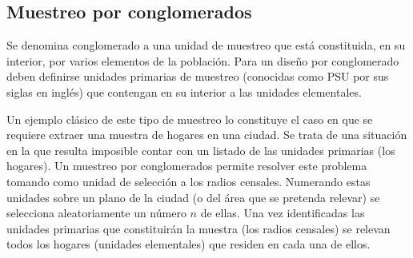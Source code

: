 \documentclass[]{book}
\begin{document}
\hypertarget{muestreo-por-conglomerados}{%
\subsection{Muestreo por conglomerados}\label{muestreo-por-conglomerados}}

Se denomina conglomerado a una unidad de muestreo que está constituida,
en su interior, por varios elementos de la población. Para un diseño por
conglomerado deben definirse unidades primarias de muestreo (conocidas como PSU por sus siglas en inglés) que contengan en su interior a las unidades elementales.

Un ejemplo clásico de este tipo de muestreo lo constituye el caso en que
se requiere extraer una muestra de hogares en una ciudad. Se trata de
una situación en la que resulta imposible contar con un listado de las
unidades primarias (los hogares). Un muestreo por conglomerados permite
resolver este problema tomando como unidad de selección a los radios censales. Numerando estas unidades sobre un plano de la ciudad (o del
área que se pretenda relevar) se selecciona aleatoriamente un número \(n\) de ellas. Una vez identificadas las unidades primarias que constituirán
la muestra (los radios censales) se relevan todos los hogares (unidades elementales) que residen en cada una de ellos.
\end{document}
